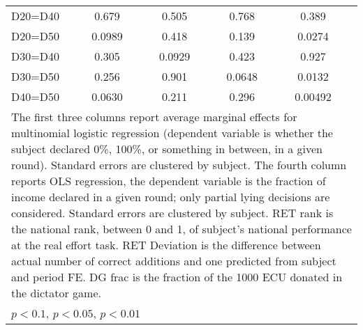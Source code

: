 \begin{tabular}{l|cccccc|cc}
D20=D40         &    0.679         &         &    0.505         &         &    0.768         &         &    0.389         &         \\
D20=D50         &   0.0989         &         &    0.418         &         &    0.139         &         &   0.0274         &         \\
D30=D40         &    0.305         &         &   0.0929         &         &    0.423         &         &    0.927         &         \\
D30=D50         &    0.256         &         &    0.901         &         &   0.0648         &         &   0.0132         &         \\
D40=D50         &   0.0630         &         &    0.211         &         &    0.296         &         &  0.00492         &         \\
\hline\hline
\multicolumn{9}{p{16cm}}{\tiny The first three columns report average marginal effects for multinomial logistic regression (dependent variable is whether the subject declared 0\%, 100\%, or something in between, in a given round). Standard errors are clustered by subject. The fourth column reports OLS regression, the dependent variable is the fraction of income declared in a given round; only partial lying decisions are considered. Standard errors are clustered by subject. RET rank is the national rank, between 0 and 1, of subject's national performance at the real effort task. RET Deviation is the difference between actual number of correct additions and one predicted from subject and period FE. DG frac is the fraction of the 1000 ECU donated in the dictator game.}\\
\multicolumn{9}{l}{\tiny \sym{*} \(p<0.1\), \sym{**} \(p<0.05\), \sym{***} \(p<0.01\)}\\
\end{tabular}